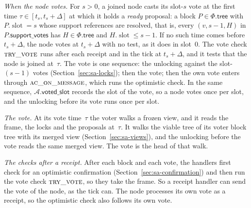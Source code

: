 \documentclass{article}
\newcommand{\slot}{\operatorname{slot}}
\newcommand{\AC}{\mathcal A}
\newcommand{\Fr}{\Phi}
\newcommand{\tree}{\mathsf{tree}}
\newcommand{\votedSlot}{\mathsf{voted\_slot}}
\begin{document}
\emph{When the node votes.}  For $s>0$, a joined node casts its slot-$s$
vote at the first time $\tau\in[t_s,t_s+\Delta]$ at which it holds a \emph{ready} proposal: a block $P\in\Fr.\tree$
with $P.\slot=s$ whose support references are resolved, that is, every
$(v,s-1,H)$ in $P.\mathsf{support\_votes}$ has $H\in\Fr.\tree$ and
$H.\slot\leq s-1$.  If no such time comes before
$t_s+\Delta$, the node votes at $t_s+\Delta$ with no test, as it does in
slot~$0$.  The vote check $\Call{try\_vote}{}$ runs after each receipt and
in the tick at $t_s+\Delta$, and it tests that the node is joined at~$\tau$.
The vote is one sequence: the unlocking against the slot-$(s-1)$ votes
(Section~\ref{sec:sa-locks}); then the vote; then the own vote enters
through $\Call{ac\_on\_message}{}$, which runs the optimistic check.  In
the same sequence, $\AC.\votedSlot$ records the slot of the vote, so a
node votes once per slot, and the unlocking before its vote runs once per
slot.

\emph{The vote.}  At its vote time~$\tau$ the voter walks a frozen view,
and it reads the frame, the locks and the proposals at~$\tau$.  It walks
the viable tree of its voter block tree with its merged view
(Section~\ref{sec:sa-views}), and the unlocking before the vote reads the
same merged view.  The vote is the head of that walk.

\emph{The checks after a receipt.}  After each block and each vote, the
handlers first check for an optimistic confirmation
(Section~\ref{sec:sa-confirmation}) and then run the vote check
$\Call{try\_vote}{}$, so they take the
frame.  So a receipt handler can send the vote of the node, as the tick
can.  The node processes its own vote as a receipt, so the optimistic
check also follows its own vote.
\end{document}
